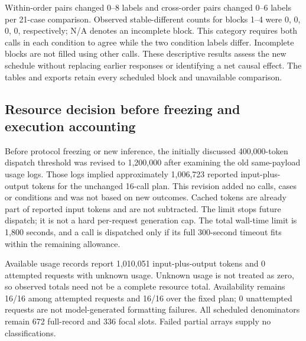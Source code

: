 \documentclass[11pt,a4paper]{article}
\begin{document}
Within-order pairs changed 0--8 labels and cross-order pairs changed 0--6 labels per 21-case comparison. Observed stable-different counts for blocks 1--4 were 0, 0, 0, 0, respectively; N/A denotes an incomplete block. This category requires both calls in each condition to agree while the two condition labels differ. Incomplete blocks are not filled using other calls. These descriptive results assess the new schedule without replacing earlier responses or identifying a net causal effect. The tables and exports retain every scheduled block and unavailable comparison.

\subsection{Resource decision before freezing and execution accounting}
Before protocol freezing or new inference, the initially discussed 400,000-token dispatch threshold was revised to 1,200,000 after examining the old same-payload usage logs. Those logs implied approximately 1,006,723 reported input-plus-output tokens for the unchanged 16-call plan. This revision added no calls, cases or conditions and was not based on new outcomes. Cached tokens are already part of reported input tokens and are not subtracted. The limit stops future dispatch; it is not a hard per-request generation cap. The total wall-time limit is 1,800 seconds, and a call is dispatched only if its full 300-second timeout fits within the remaining allowance.

Available usage records report 1,010,051 input-plus-output tokens and 0 attempted requests with unknown usage. Unknown usage is not treated as zero, so observed totals need not be a complete resource total. Availability remains 16/16 among attempted requests and 16/16 over the fixed plan; 0 unattempted requests are not model-generated formatting failures. All scheduled denominators remain 672 full-record and 336 focal slots. Failed partial arrays supply no classifications.
\end{document}
